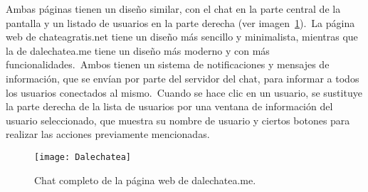 Ambas páginas tienen un diseño similar, con el chat en la parte central de la pantalla y un listado de usuarios en
la parte derecha (ver imagen~\ref{fig:chatCompleto}).\ La página web de chateagratis.net tiene un diseño más sencillo
y minimalista, mientras que la de
dalechatea.me tiene un diseño más moderno y con más funcionalidades.\ Ambos tienen un sistema de notificaciones y
mensajes de información, que se envían por parte del servidor del chat, para informar a todos los usuarios conectados
al mismo.\ Cuando se hace clic en un usuario, se sustituye la parte derecha de la lista de usuarios por una ventana de
información del usuario seleccionado, que muestra su nombre de usuario y ciertos botones para realizar las acciones
previamente mencionadas.


\begin{figure}[H]
	\centering
	\texttt{[image: Dalechatea]}
	\caption{Chat completo de la página web de dalechatea.me.}
	\label{fig:chatCompleto}
\end{figure}


